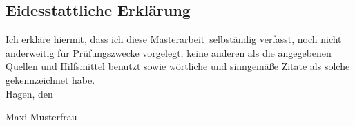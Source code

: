 \documentclass[twoside,bibliography=totoc,openany]{fumi}
\newcommand{\thesisauthor}{Maxi Musterfrau}
\newcommand{\thesistype}{Masterarbeit} %
\begin{document}
\subsection*{Eidesstattliche Erklärung}
Ich erkläre hiermit, dass ich diese \thesistype~selbständig verfasst, noch nicht anderweitig für Prüfungszwecke vorgelegt, keine anderen als die angegebenen Quellen und Hilfsmittel benutzt sowie wörtliche und sinngemäße Zitate als solche gekennzeichnet habe.\\[1cm]
Hagen, den \dotfill

\hspace{2cm}{\footnotesize Datum}\hspace{5cm} {\footnotesize \thesisauthor}
\end{document}
